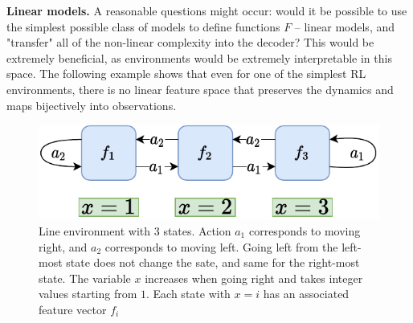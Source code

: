 \documentclass[a4paper,11pt,oneside]{report}
\begin{document}
{\bf Linear models.} A reasonable questions might occur: would it be possible to use the simplest possible class of models to define functions $F$ -- linear models, and "transfer" all of the non-linear complexity into the decoder? This would be extremely beneficial, as environments would be extremely interpretable in this space. The following example shows that even for one of the simplest RL environments, there is no linear feature space that preserves the dynamics and maps bijectively into observations.

\begin{figure}
    \centering
    \includegraphics[width=0.7\linewidth]{diagrams/env_line_3}
    \caption{Line environment with 3 states. Action $a_1$ corresponds to moving right, and $a_2$ corresponds to moving left. Going left from the left-most state does not change the sate, and same for the right-most state. The variable $x$ increases when going right and takes integer values starting from $1$. Each state with $x=i$ has an associated feature vector $f_i$}
    \label{fig:env_line3}
\end{figure}
\end{document}
